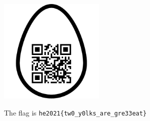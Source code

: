 \documentclass[english,a4paper,nols,noindent]{tufte-handout}
\begin{document}
\begin{marginfigure}
    \includegraphics[width=50mm]{ch32/qr.png}
\end{marginfigure}

The flag is \verb+he2021{tw0_y0lks_are_gre33eat}+
\end{document}
